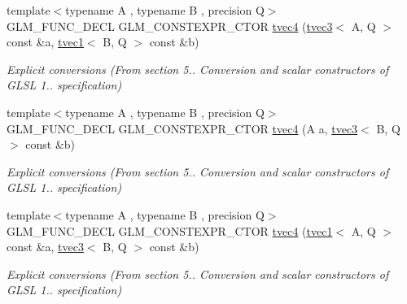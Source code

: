 \begin{DoxyCompactItemize}
\mbox{\label{structglm_1_1tvec4_aff338bbba3d73d36cda06a09a676d934}} 
{\footnotesize template$<$typename A , typename B , precision Q$>$ }\\G\+L\+M\+\_\+\+F\+U\+N\+C\+\_\+\+D\+E\+CL G\+L\+M\+\_\+\+C\+O\+N\+S\+T\+E\+X\+P\+R\+\_\+\+C\+T\+OR \hyperlink{structglm_1_1tvec4_aff338bbba3d73d36cda06a09a676d934}{tvec4} (\hyperlink{structglm_1_1tvec3}{tvec3}$<$ A, Q $>$ const \&a, \hyperlink{structglm_1_1tvec1}{tvec1}$<$ B, Q $>$ const \&b)
\begin{DoxyCompactList}\small\item\em Explicit conversions (From section 5.. Conversion and scalar constructors of G\+L\+SL 1.. specification) \end{DoxyCompactList}\item 
\mbox{\label{structglm_1_1tvec4_a20fd8534260d3d1a5e8e5b70831bd4f6}} 
{\footnotesize template$<$typename A , typename B , precision Q$>$ }\\G\+L\+M\+\_\+\+F\+U\+N\+C\+\_\+\+D\+E\+CL G\+L\+M\+\_\+\+C\+O\+N\+S\+T\+E\+X\+P\+R\+\_\+\+C\+T\+OR \hyperlink{structglm_1_1tvec4_a20fd8534260d3d1a5e8e5b70831bd4f6}{tvec4} (A a, \hyperlink{structglm_1_1tvec3}{tvec3}$<$ B, Q $>$ const \&b)
\begin{DoxyCompactList}\small\item\em Explicit conversions (From section 5.. Conversion and scalar constructors of G\+L\+SL 1.. specification) \end{DoxyCompactList}\item 
\mbox{\label{structglm_1_1tvec4_a0ac38c053c7884c80e19ad3d96367cc0}} 
{\footnotesize template$<$typename A , typename B , precision Q$>$ }\\G\+L\+M\+\_\+\+F\+U\+N\+C\+\_\+\+D\+E\+CL G\+L\+M\+\_\+\+C\+O\+N\+S\+T\+E\+X\+P\+R\+\_\+\+C\+T\+OR \hyperlink{structglm_1_1tvec4_a0ac38c053c7884c80e19ad3d96367cc0}{tvec4} (\hyperlink{structglm_1_1tvec1}{tvec1}$<$ A, Q $>$ const \&a, \hyperlink{structglm_1_1tvec3}{tvec3}$<$ B, Q $>$ const \&b)
\begin{DoxyCompactList}\small\item\em Explicit conversions (From section 5.. Conversion and scalar constructors of G\+L\+SL 1.. specification) \end{DoxyCompactList}\item 
\mbox{\label{structglm_1_1tvec4_ab8d5ba79004e6e4d9ca3ee4f06c3d065}} 

\end{DoxyCompactItemize}
